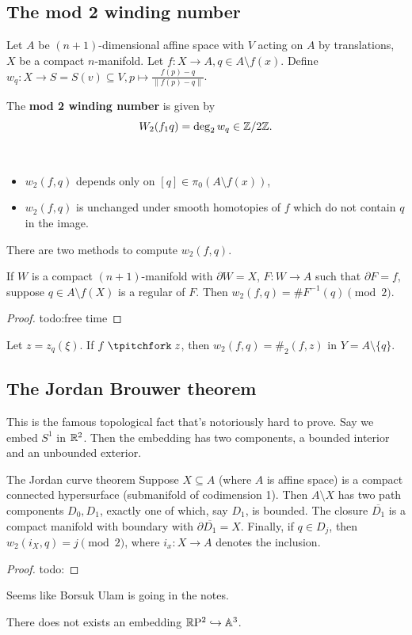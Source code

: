 \subsection{The mod 2 winding number}
Let $A$ be $(n+1)$-dimensional affine space with $V$ acting on $A$ by translations, $X$ be a compact $n$-manifold. Let $f \colon X \to A, q \in A \setminus f(x)$. Define $w_q \colon X \to S=S(v) \subseteq V, p \mapsto  \frac{f(p)-q}{\|f(p)-q\|}$. 
\begin{definition}
    The \textbf{mod 2 winding number} is given by \[
        W_2(f_1 q)=\deg_2 w_q \in \mathbb{Z} /2\mathbb{Z}.
    \] 
\end{definition}
\begin{remark}\,
    \begin{itemize}
        \setlength\itemsep{-.2em}
        \item $w_2(f,q)$ depends only on $[q] \in \pi_0(A \setminus f(x))$,
        \item $w_2(f,q)$ is unchanged under smooth homotopies of $f$ which do not contain $q$ in the image.
    \end{itemize}
\end{remark}
There are two methods to compute $w_2(f,q)$.
\begin{theorem}
    If $W$ is a compact $(n+1)$-manifold with $\partial W=X$, $F \colon W \to A$ such that $\partial F=f$, suppose $q \in A \setminus f(X)$ is a regular of $F$. Then $w_2(f,q)=\# F^{-1}(q) \pmod 2$.
\end{theorem}
\begin{proof}
    {\color{red}todo:free time} 
\end{proof}
\begin{theorem}
    Let $z=z_q(\xi)$. If $f\transv z$, then $w_2(f,q)=\#_2(f,z)$ in $Y=A \setminus \{q\} $.
\end{theorem}

\subsection{The Jordan Brouwer theorem}
This is the famous topological fact that's notoriously hard to prove. Say we embed $S^1 $ in $\mathbb{R}^2$. Then the embedding has two components, a bounded interior and an unbounded exterior.
\begin{namedthm}{The Jordan curve theorem} 
    Suppose $X \subseteq A$ (where $A$ is affine space) is a compact connected hypersurface (submanifold of codimension 1). Then $A \setminus X$ has two path components $D_0,D_1$, exactly one of which, say $D_1$, is bounded. The closure $\overline{D_1}$ is a compact manifold with boundary with $\partial \overline{D_1}=X$. Finally, if $q \in D_j $, then $w_2(i_X,q)=j\pmod 2$, where $i_x \colon X \to A$ denotes the inclusion.
\end{namedthm}
\begin{proof}
    {\color{red}todo:} 
\end{proof}
Seems like Borsuk Ulam is going in the notes.
\begin{cor}
    There does not exists an embedding $\mathbb{R} \mathrm P^2 \hookrightarrow \mathbb{A}^3$.
\end{cor}
